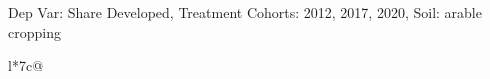 \begin{table}[H]
\captionlistentry[table]{}
\label{table:beaver_land_class_DVis_land_class_3_SCg123_SSAC}
\scriptsize %
Dep Var: Share Developed, Treatment Cohorts: 2012, 2017, 2020, Soil: arable cropping \\
\begin{threeparttable}
\begin{tabulary}{\textwidth}{l*{7}{c}@{}}
\toprule \toprule
\noalign{\smallskip}
\noalign{\smallskip}
\midrule \bottomrule
\end{tabulary}
\medskip
\end{threeparttable}
\end{table}

